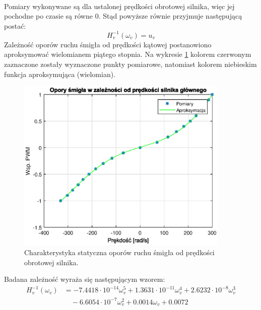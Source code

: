 \documentclass[11pt,a4paper]{article}
\begin{document}
\paragraph*{}
Pomiary wykonywane są dla ustalonej prędkości obrotowej silnika, więc jej pochodne po czasie są równe \(0\). Stąd powyższe równie przyjmuje następującą postać:
\begin{equation}
H_v^{-1}(\omega_v) = u_v
\end{equation}
Zależność oporów ruchu śmigła od prędkości kątowej postanowiono aproksymować wielomianem piątego stopnia. Na wykresie \ref{fig:char_U_V} kolorem czerwonym zaznaczone zostały wyznaczone punkty pomiarowe, natomiast kolorem niebieskim funkcja aproksymująca (wielomian).

\begin{figure}[h]
	\centering
	\includegraphics[width=4in]{Figures/char_U_V.eps}
	\caption{Charakterystyka statyczna oporów ruchu śmigła od prędkości obrotowej silnika.}
	\label{fig:char_U_V}
\end{figure}

Badana zależność wyraża się następującym wzorem:
\begin{equation}
\begin{aligned}
H_v^{-1}(\omega_v) &= -7.4418\cdot 10^{-14}\omega_v^5+1.3631\cdot 10^{-11}\omega_v^4+2.6232\cdot 10^{-8}\omega_v^3\\ & \quad -6.6054\cdot 10^{-7}\omega_v^2+0.0014\omega_v+0.0072
\end{aligned}
\end{equation}
\end{document}
